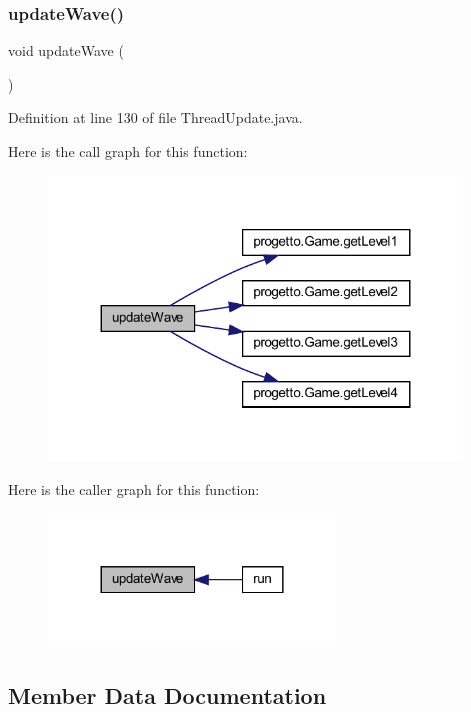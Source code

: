 \subsubsection{\texorpdfstring{update\+Wave()}{updateWave()}}
{\footnotesize\ttfamily void update\+Wave (\begin{DoxyParamCaption}{ }\end{DoxyParamCaption})\hspace{0.3cm}{\ttfamily [private]}}



Definition at line 130 of file Thread\+Update.\+java.

Here is the call graph for this function\+:\nopagebreak
\begin{figure}[H]
\begin{center}
\leavevmode
\includegraphics[width=311pt]{classprogetto_1_1_thread_update_ab424ab29e7ab4733f2efd1e6ef3f13b1_cgraph}
\end{center}
\end{figure}
Here is the caller graph for this function\+:\nopagebreak
\begin{figure}[H]
\begin{center}
\leavevmode
\includegraphics[width=216pt]{classprogetto_1_1_thread_update_ab424ab29e7ab4733f2efd1e6ef3f13b1_icgraph}
\end{center}
\end{figure}


\subsection{Member Data Documentation}
\mbox{\label{classprogetto_1_1_thread_update_ac6a5ed6191fcf3a5bf0445921feb4f48}} 
